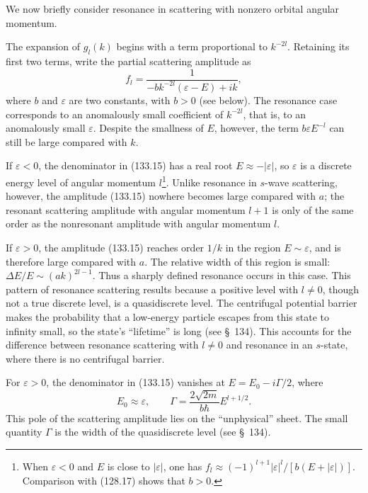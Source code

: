 We now briefly consider resonance in scattering with nonzero orbital angular
momentum.

The expansion of $g_l(k)$ begins with a term proportional to $k^{-2l}$.
Retaining its first two terms, write the partial scattering amplitude as
\begin{equation}
 f_l=\frac1{-bk^{-2l}(\varepsilon-E)+ik},
 \tag{133.15}
\end{equation}
where $b$ and $\varepsilon$ are two constants, with $b>0$ (see below). The
resonance case corresponds to an anomalously small coefficient of $k^{-2l}$,
that is, to an anomalously small $\varepsilon$. Despite the smallness of $E$,
however, the term $b\varepsilon E^{-l}$ can still be large compared with $k$.

If $\varepsilon<0$, the denominator in (133.15) has a real root
$E\approx-|\varepsilon|$, so $\varepsilon$ is a discrete energy level of
angular momentum $l$\footnote{When $\varepsilon<0$ and $E$ is close to
$|\varepsilon|$, one has
$f_l\approx(-1)^{l+1}|\varepsilon|^l/[b(E+|\varepsilon|)]$. Comparison with
(128.17) shows that $b>0$.}. Unlike resonance in $s$-wave scattering,
however, the amplitude (133.15) nowhere becomes large compared with $a$; the
resonant scattering amplitude with angular momentum $l+1$ is only of the same
order as the nonresonant amplitude with angular momentum $l$.

If $\varepsilon>0$, the amplitude (133.15) reaches order $1/k$ in the region
$E\sim\varepsilon$, and is therefore large compared with $a$. The relative
width of this region is small:
$\Delta E/E\sim(ak)^{2l-1}$. Thus a sharply defined resonance occurs in this
case. This pattern of resonance scattering results because a positive level
with $l\ne0$, though not a true discrete level, is a quasidiscrete level. The
centrifugal potential barrier makes the probability that a low-energy
particle escapes from this state to infinity small, so the state's
``lifetime'' is long (see \S~134). This accounts for the difference between
resonance scattering with $l\ne0$ and resonance in an $s$-state, where there
is no centrifugal barrier.

For $\varepsilon>0$, the denominator in (133.15) vanishes at
$E=E_0-i\Gamma/2$, where
\begin{equation}
 E_0\approx\varepsilon,\qquad \Gamma=\frac{2\sqrt{2m}}{b\hbar}E^{l+1/2}.
 \tag{133.16}
\end{equation}
This pole of the scattering amplitude lies on the ``unphysical'' sheet. The
small quantity $\Gamma$ is the width of the quasidiscrete level (see \S~134).

